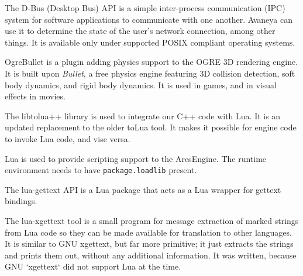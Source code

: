 
The D-Bus (Desktop Bus) API is a simple inter-process communication (IPC) system for software applications to communicate with one another. Avaneya can use it to determine the state of the user's network connection, among other things. It is available only under supported POSIX compliant operating systems.
\stopitemize


\startitemize[3]
\setupwhitespace[big]

OgreBullet is a plugin adding physics support to the OGRE 3D rendering engine. It is built upon {\it Bullet}, a free physics engine featuring 3D collision detection, soft body dynamics, and rigid body dynamics. It is used in games, and in visual effects in movies.
\stopitemize



\startitemize[3]
\setupwhitespace[big]

The libtolua++ library is used to integrate our C++ code with Lua. It is an updated replacement to the older toLua tool. It makes it possible for engine code to invoke Lua code, and vise versa.


Lua is used to provide scripting support to the AresEngine. The runtime environment needs to have {\tt package.loadlib} present.


The lua-gettext API is a Lua package that acts as a Lua wrapper for gettext bindings.


The lua-xgettext tool is a small program for message extraction of marked strings from Lua code so they can be made available for translation to other languages. It is similar to GNU xgettext, but far more primitive; it just extracts the strings and prints them out, without any additional information. It was written, because GNU `xgettext` did not support Lua at the time.
\stopitemize

\StopChapter

